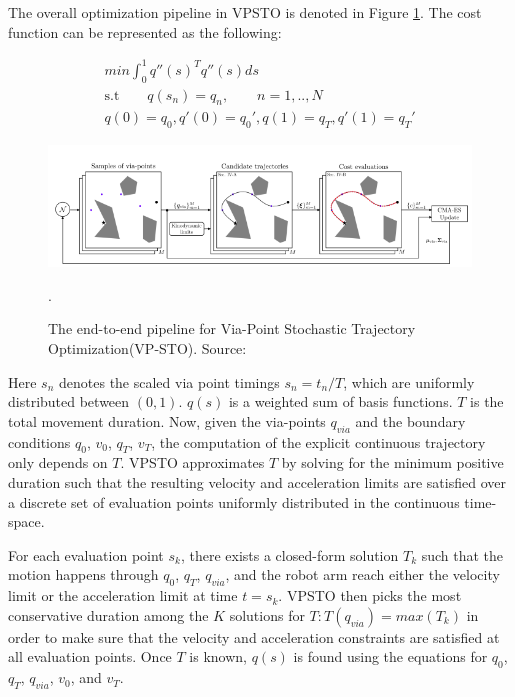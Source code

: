 The overall optimization pipeline in VPSTO is denoted in Figure {\ref{fig:vpsto}}. The cost function can be represented as the following:

\begin{subequations}
\begin{align}
    min \int_{0}^{1}q''(s)^Tq''(s)ds \\
    \text{s.t} \qquad q(s_n) = q_n, \qquad n = 1,..,N \\
    q(0) = q_0, q'(0) = q_0', q(1) = q_T, q'(1) = q_T'
\end{align}
\end{subequations}



\begin{figure}[ht]
    \centering
    \includegraphics[scale=0.5]{figures/bl-manipulator/vpsto.png}
    \caption[The VPSTO pipeline]{The end-to-end pipeline for Via-Point Stochastic Trajectory Optimization(VP-STO). Source: \cite{VPSTO}}.
    \label{fig:vpsto}
\end{figure}


Here $s_n$ denotes the scaled via point timings $s_n = t_n/T$, which are uniformly distributed between $(0,1)$. $q(s)$ is a weighted sum of basis functions. $T$ is the total movement duration. Now, given the via-points $q_{via}$ and the boundary conditions $q_0$, $v_0$, $q_T$, $v_T$, the computation of the explicit continuous trajectory only depends on $T$. VPSTO approximates $T$ by solving for the minimum positive duration such that the resulting velocity and acceleration limits are satisfied over a discrete set of evaluation points uniformly distributed in the continuous time-space. 

For each evaluation point $s_k$, there exists a closed-form solution $T_k$ such that the motion happens through $q_0$, $q_T$, $q_{via}$, and the robot arm reach either the velocity limit or the acceleration limit at time $t = s_k$. VPSTO then picks the most conservative duration among the $K$ solutions for $T: T(q_{via}) = max(T_k)$ in order to make sure that the velocity and acceleration constraints are satisfied at all evaluation points. Once $T$ is known, $q(s)$ is found using the equations for $q_0$, $q_T$, $q_{via}$, $v_0$, and $v_T$. 

